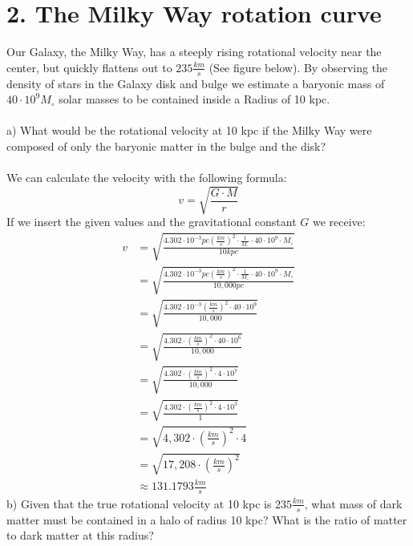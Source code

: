 \section*{2. The Milky Way rotation curve}

Our Galaxy, the Milky Way, has a steeply rising rotational velocity near the center, but quickly flattens
out to $235 \frac{km}{s}$ (See figure below). By observing the density of stars in the Galaxy disk and
bulge we estimate a baryonic mass of $40 \cdot 10^9 M_{\circ}$ solar masses to be contained inside a 
Radius of 10 kpc.\\
\\
a) What would be the rotational velocity at 10 kpc if the Milky Way were composed of only the baryonic
matter in the bulge and the disk?\\
\\
We can calculate  the velocity with the following formula:
\begin{equation*}
  v = \sqrt{\frac{G \cdot M}{r}}
\end{equation*}
If we insert the given values and the gravitational constant $G$ we receive:
\begin{equation*}
  \begin{split}
    v &= \sqrt{\frac{4.302 \cdot 10^{-3} pc (\frac{km}{s})^2 \cdot \frac{1}{M_{\circ}} \cdot 40 \cdot 10^9 \cdot M_{\circ}}{10 kpc}}\\
      &= \sqrt{\frac{4.302 \cdot 10^{-3} pc (\frac{km}{s})^2 \cdot \frac{1}{M_{\circ}} \cdot 40 \cdot 10^9 \cdot M_{\circ}}{10,000 pc}}\\
      &= \sqrt{\frac{4.302 \cdot 10^{-3} (\frac{km}{s})^2 \cdot 40 \cdot 10^9}{10,000}}\\
      &= \sqrt{\frac{4.302 \cdot (\frac{km}{s})^2 \cdot 40 \cdot 10^6}{10,000}}\\
      &= \sqrt{\frac{4.302 \cdot (\frac{km}{s})^2 \cdot 4 \cdot 10^7}{10,000}}\\
      &= \sqrt{\frac{4.302 \cdot (\frac{km}{s})^2 \cdot 4 \cdot 10^3}{1}}\\
      &= \sqrt{4,302 \cdot (\frac{km}{s})^2 \cdot 4}\\
      &= \sqrt{17,208 \cdot (\frac{km}{s})^2}\\
      &\approx 131.1793 \frac{km}{s}
  \end{split}
\end{equation*}
b) Given that the true rotational velocity at 10 kpc is $235 \frac{km}{s}$, what mass of dark matter must
be contained in a halo of radius 10 kpc? What is the ratio of matter to dark matter at this radius?\\
